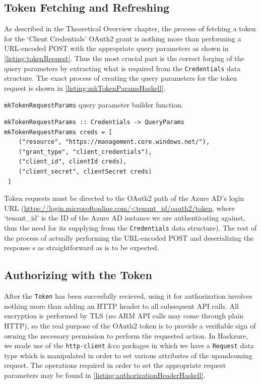 \documentclass[11pt]{report}
\begin{document}
\subsection{Token Fetching and Refreshing}

As described in the Theoretical Overview chapter, the process of fetching a
token for the `Client Credentials' OAuth2 grant is nothing more than performing
a URL-encoded POST with the appropriate query parameters as shown in
\autoref{listing:tokenRequest}. Thus the most crucial part is the correct
forging of the query parameters by extracting what is required from the
\texttt{Credentials} data structure. The exact process of creating the query
parameters for the token request is shown in
\autoref{listing:mkTokenParamsHaskell}.

\begin{listing}[H]
\label{listing:mkTokenParamsHaskell}
\caption{\texttt{mkTokenRequestParams} query parameter builder function.}
\begin{verbatim}
mkTokenRequestParams :: Credentials -> QueryParams
mkTokenRequestParams creds = [
    ("resource", "https://management.core.windows.net/"),
    ("grant_type", "client_credentials"),
    ("client_id", clientId creds),
    ("client_secret", clientSecret creds)
 ]
\end{verbatim}
\end{listing}

Token requests must be directed to the OAuth2 path of the Azure AD's login URL
(\url{https://login.microsoftonline.com/<tenant_id/oauth2/token}, where
`tenant\_id' is the ID of the Azure AD instance we are authenticating against,
thus the need for its supplying from the \texttt{Credentials} data structure).
The rest of the process of actually performing the URL-encoded POST and
deserializing the response s as straightforward as is to be expected.

\subsection{Authorizing with the Token}

After the \texttt{Token} has been succesfully recieved, using it for
authorization involves nothing more than adding an HTTP header to all
subsequent API calls. All encryption is performed by TLS (no ARM API calls
may come through plain HTTP), so the real purpose of the OAuth2 token is to
provide a verifiable sign of owning the necessary permission to perform the
requested action. \newline
In Haskzure, we made use of the \texttt{http-client}\cite{packageHTTPClient}
\&co packages in which we have a \texttt{Request} data type which is
manipulated in order to set various attributes of the upandcoming request.
The operations required in order to set the appropriate request parameters
may be found in \autoref{listing:authorizationHeaderHaskell}.
\end{document}
